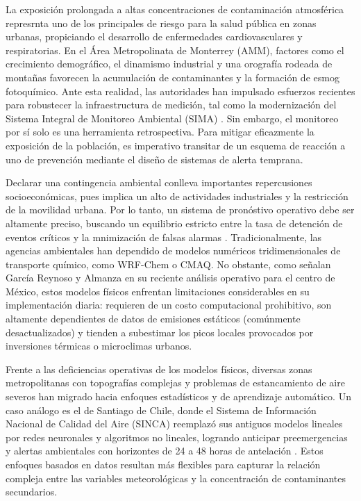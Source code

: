 \documentclass[11pt]{article}
\begin{document}
La exposición prolongada a altas concentraciones de contaminación atmosférica represrnta uno de los principales de riesgo para la salud pública en zonas urbanas, propiciando el desarrollo de enfermedades cardiovasculares y respiratorias. En el Área Metropolinata de Monterrey (AMM), factores como el crecimiento demográfico, el dinamismo industrial y una orografía rodeada de montañas favorecen la acumulación de contaminantes y la formación de esmog fotoquímico. Ante esta realidad, las autoridades han impulsado esfuerzos recientes para robustecer la infraestructura de medición, tal como la modernización del Sistema Integral de Monitoreo Ambiental (SIMA) \cite{gobnl2025}. Sin embargo, el monitoreo por sí solo es una herramienta retrospectiva. Para mitigar eficazmente la exposición de la población, es imperativo transitar de un esquema de reacción a uno de prevención mediante el diseño de sistemas de alerta temprana.

Declarar una contingencia ambiental conlleva importantes repercusiones socioeconómicas, pues implica un alto de actividades industriales y la restricción de la movilidad urbana. Por lo tanto, un sistema de pronóstivo operativo debe ser altamente preciso, buscando un equilibrio estricto entre la tasa de detención de eventos críticos y la mnimización de falsas alarmas \cite{montero2011}. Tradicionalmente, las agencias ambientales han dependido de modelos numéricos tridimensionales de transporte químico, como WRF-Chem o CMAQ. No obstante, como señalan García Reynoso y Almanza \cite{garciareynoso2026} en su reciente análisis operativo para el centro de México, estos modelos físicos enfrentan limitaciones considerables en su implementación diaria: requieren de un costo computacional prohibitivo, son altamente dependientes de datos de emisiones estáticos (comúnmente desactualizados) y tienden a subestimar los picos locales provocados por inversiones térmicas o microclimas urbanos.

Frente a las deficiencias operativas de los modelos físicos, diversas zonas metropolitanas con topografías complejas y problemas de estancamiento de aire severos han migrado hacia enfoques estadísticos y de aprendizaje automático. Un caso análogo es el de Santiago de Chile, donde el Sistema de Información Nacional de Calidad del Aire (SINCA) reemplazó sus antiguos modelos lineales por redes neuronales y algoritmos no lineales, logrando anticipar preemergencias y alertas ambientales con horizontes de 24 a 48 horas de antelación \cite{mma2021_calidadaire}. Estos enfoques basados en datos resultan más flexibles para capturar la relación compleja entre las variables meteorológicas y la concentración de contaminantes secundarios.
\end{document}
